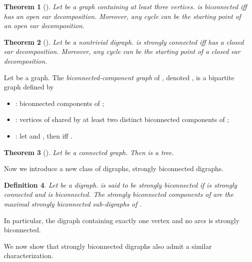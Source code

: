 \documentclass{article}
\newtheorem{thm}{Theorem}
\newtheorem{defn}[thm]{Definition}
\begin{document}
\begin{thm}[\cite{West00}]\label{thm:bi-connected}
Let  be a graph containing at least three vertices.  is
biconnected iff  has an open ear decomposition. Moreover, any
cycle can be the starting point of an open ear decomposition.
\end{thm}

\begin{thm}[\cite{BangGutin00}]\label{thm:strong}
Let  be a nontrivial digraph.  is strongly connected iff 
has a closed ear decomposition. Moreover, any cycle can be the
starting point of a closed ear decomposition.
\end{thm}

Let  be a graph. The \emph{biconnected-component graph} of
, denoted , is a bipartite graph
 defined by
\begin{itemize}
\item : biconnected components of ;

\item : vertices of  shared by
at least two distinct biconnected components of ;

\item : let  and , then 
iff .
\end{itemize}

\begin{thm}[\cite{West00}]\label{thm:biconn-components}
Let  be a connected graph. Then  is a
tree.
\end{thm}

\smallskip

\noindent Now we introduce a new class of digraphs, strongly
biconnected digraphs.

\begin{defn}
Let  be a digraph.  is said to be strongly biconnected if 
is strongly connected and  is biconnected. The
strongly biconnected components of  are the maximal strongly
biconnected sub-digraphs of .
\end{defn}
In particular, the digraph containing exactly one vertex and no arcs
is strongly biconnected.

\noindent We now show that strongly biconnected digraphs also admit
a similar characterization.
\end{document}
